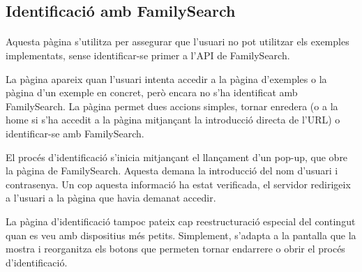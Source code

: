 \subsection{Identificació amb FamilySearch}

    \paragraph{}
    Aquesta pàgina s'utilitza per assegurar que l'usuari no pot utilitzar els exemples implementats, sense identificar-se primer a l’API de FamilySearch.

    La pàgina apareix quan l'usuari intenta accedir a la pàgina d'exemples o la pàgina d'un exemple en concret, però encara no s’ha identificat amb FamilySearch. La pàgina permet dues accions simples, tornar enredera (o a la home si s'ha accedit a la pàgina mitjançant la introducció directa de l'URL) o identificar-se amb FamilySearch.

    El procés d'identificació s'inicia mitjançant el llançament d'un pop-up, que obre la pàgina de FamilySearch. Aquesta demana la introducció del nom d'usuari i contrasenya. Un cop aquesta informació ha estat verificada, el servidor redirigeix a l'usuari a la pàgina que havia demanat accedir.

    La pàgina d'identificació tampoc pateix cap reestructuració especial del contingut quan es veu amb dispositius més petits. Simplement, s'adapta a la pantalla que la mostra i reorganitza els botons que permeten tornar endarrere o obrir el procés d’identificació.
